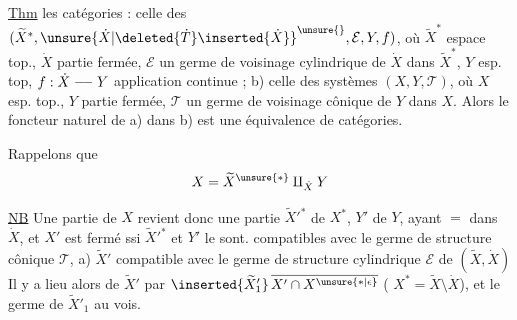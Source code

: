 \uline{Thm}  les  catégories  :
 celle des 
$(\widetilde X^*,{\unsure{\dot X|\deleted{\dot T}\inserted{\dot X}}}^{\unsure{}},\mathcal E,Y,f)$, où
$\widetilde X^*$ espace top., $\dot X$ partie fermée, $\mathcal E$ un germe
de voisinage cylindrique de $\dot X$ dans $\widetilde X^*$,
$Y$ esp. top, $f:\dot X\mathrel{\relbar\joinrel\relbar}Y$ application continue ;
b) celle des systèmes $(X,Y,\mathcal T)$, où
$X$ esp. top., $Y$ partie fermée, $\mathcal T$ un germe
de voisinage cônique de $Y$ dans $X$. 
 Alors le foncteur naturel  de a)
dans b) est une équivalence de catégories.


Rappelons que
\[
X=\widetilde X^{\unsure{*}}\amalg_{\dot X}Y
\]

\uline{NB} Une partie  de $X$ revient donc  une
partie $\widetilde X'^*$ de $X^*$, $Y'$ de $Y$, ayant $=$
 dans $\dot X$, et $X'$ est fermé ssi
$\widetilde X'^*$ et $Y'$ le sont. 
compatibles avec le germe de structure
cônique $\mathcal T$, 
a) $\widetilde X'$ compatible avec le germe de structure
cylindrique $\mathcal E$ de $(\widetilde X,\dot X)$
Il y a lieu alors de  $\widetilde X'$ par
$\inserted{\widetilde X'_1}\,\overline{X'\cap X^{\unsure{*|\epsilon}}}$
( $X^*=\widetilde X\setminus\dot X$), et le germe de $\widetilde X'_1$ au vois.
